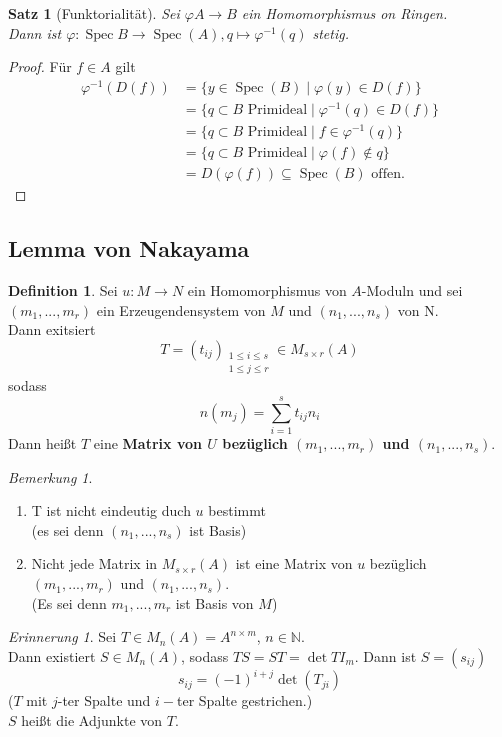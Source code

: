 \documentclass[10pt,a4paper]{article}
\newcommand{\N}{\ensuremath{\mathbb{N}}}
\newcommand{\Spec}{\ensuremath{\operatorname{Spec}}}
\newcounter{thm}[section]
\theoremstyle{definition}
\newtheorem{definition}[thm]{Definition}
\theoremstyle{plain}
\newtheorem{satz}[thm]{Satz}
\theoremstyle{remark}
\newtheorem*{bem*}{Bemerkung}
\newtheorem{rem}[thm]{Erinnerung}
\begin{document}
\begin{satz}[Funktorialität]
	\label{420satz}
	Sei $\varphi
	A\rightarrow  B$ ein Homomorphismus on Ringen.\\
	Dann ist $\varphi:\Spec B\to\Spec(A),q\mapsto \varphi^{-1}(q)$ stetig.
\end{satz}
\begin{proof}
	Für $f\in A$ gilt
	\begin{align*}
	\varphi^{-1}(D(f))&=\{y\in\Spec(B)\mid\varphi(y)\in D(f)\}\\
	&=\{q\subset B\text{ Primideal}\mid\varphi^{-1}(q)\in D(f)\}\\
	&=\{q\subset B\text{ Primideal}\mid f\in \varphi^{-1}(q)\}\\
	&=\{q\subset B\text{ Primideal}\mid\varphi(f)\notin q\}\\
	&=D(\varphi(f))\subseteq\Spec(B)\text{ offen.}
	\end{align*}
\end{proof}




\subsection{Lemma von Nakayama}
\begin{definition}
	Sei $u:M\rightarrow N$ ein Homomorphismus von $A$-Moduln und sei $(m_1,...,m_r)$ ein Erzeugendensystem von $M$ und $(n_1,...,n_s)$ von N.\\
	Dann exitsiert
	\[T=(t_{ij})_{\substack{1\le i\le s\\ 1\le j\le r}}\in M_{s\times r}(A)\]
	sodass
	\[n(m_j)=\sum_{i=1}^{s}t_{ij}n_i\]
	Dann heißt $T$ eine \textbf{Matrix von $U$ bezüglich $(m_1,...,m_r)$ und $(n_1,...,n_s)$}.
\end{definition}

\begin{bem*}
	\begin{enumerate}
		\item T ist nicht eindeutig duch $u$ bestimmt\\
		(es sei denn $(n_1,...,n_s)$ ist Basis)
		\item Nicht jede Matrix in $M_{s\times r}(A)$ ist eine Matrix von $u$ bezüglich $(m_1,...,m_r)$ und $(n_1,...,n_s)$.\\
		(Es sei denn $m_1,...,m_r$ ist Basis von $M$)
	\end{enumerate}
\end{bem*}

\begin{rem}
	Sei $T\in M_n(A)=A^{n\times m}$, $n\in \N$.\\
	Dann existiert $S\in M_n(A)$, sodass $TS=ST=\det TI_m$. Dann ist $S=(s_{ij})$
	\[s_{ij}=(-1)^{i+j}\det(T_{ji})\]
	($T$ mit $j$-ter Spalte und $i-$ter Spalte gestrichen.)\\
	$S$ heißt die Adjunkte von $T$.
\end{rem}
\end{document}
